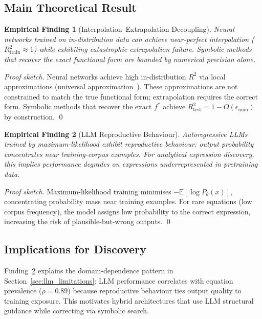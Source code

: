 \documentclass[twoside,11pt]{article}
\newcommand{\Rsq}{R^{2}}
\newcommand{\Rtrain}{R^{2}_{\mathrm{train}}}
\newcommand{\Rtest}{R^{2}_{\mathrm{test}}}
\newtheorem{finding}{Empirical Finding}
\begin{document}
\subsection{Main Theoretical Result}
\label{sec:theory_main}

\begin{finding}[Interpolation--Extrapolation Decoupling]
\label{prop:interp_extrap_decoupling}
Neural networks trained on in-distribution data can achieve near-perfect interpolation ($\Rtrain \approx 1$) while exhibiting catastrophic extrapolation failure. Symbolic methods that recover the exact functional form are bounded by numerical precision alone.
\end{finding}

\begin{proof}[Proof sketch]
Neural networks achieve high in-distribution $\Rsq$ via local approximations (universal approximation~\citep{hornik1989multilayer}). These approximations are not constrained to match the true functional form; extrapolation requires the correct form. Symbolic methods that recover the exact $f^*$ achieve $\Rtest = 1 - O(\epsilon_{\text{num}})$ by construction. \qed
\end{proof}

\begin{finding}[LLM Reproductive Behaviour]
\label{thm:llm_reproductive}
Autoregressive LLMs trained by maximum-likelihood exhibit reproductive behaviour: output probability concentrates near training-corpus examples. For analytical expression discovery, this implies performance degrades on expressions underrepresented in pretraining data.
\end{finding}

\begin{proof}[Proof sketch]
Maximum-likelihood training minimises $-\mathbb{E}[\log P_\theta(x)]$, concentrating probability mass near training examples. For rare equations (low corpus frequency), the model assigns low probability to the correct expression, increasing the risk of plausible-but-wrong outputs. \qed
\end{proof}

\subsection{Implications for Discovery}
\label{sec:theory_implications}

Finding~\ref{thm:llm_reproductive} explains the domain-dependence pattern in Section~\ref{sec:llm_limitations}: LLM performance correlates with equation prevalence ($\rho = 0.89$) because reproductive behaviour ties output quality to training exposure. This motivates hybrid architectures that use LLM structural guidance while correcting via symbolic search.
\end{document}
